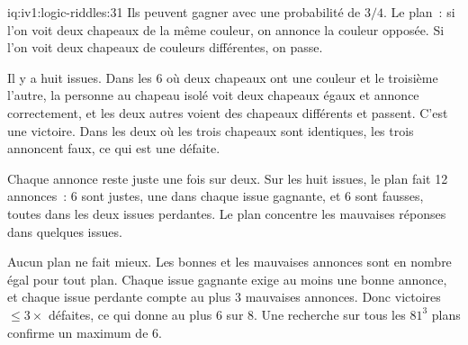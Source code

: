 \begin{solution}{iq:iv1:logic-riddles:31}
Ils peuvent gagner avec une probabilité de $3/4$. Le plan~: si l'on voit deux chapeaux de la même couleur, on annonce la couleur opposée. Si l'on voit deux chapeaux de couleurs différentes, on passe.

Il y a huit issues. Dans les 6 où deux chapeaux ont une couleur et le troisième l'autre, la personne au chapeau isolé voit deux chapeaux égaux et annonce correctement, et les deux autres voient des chapeaux différents et passent. C'est une victoire. Dans les deux où les trois chapeaux sont identiques, les trois annoncent faux, ce qui est une défaite.

Chaque annonce reste juste une fois sur deux. Sur les huit issues, le plan fait 12 annonces~: 6 sont justes, une dans chaque issue gagnante, et 6 sont fausses, toutes dans les deux issues perdantes. Le plan concentre les mauvaises réponses dans quelques issues.

Aucun plan ne fait mieux. Les bonnes et les mauvaises annonces sont en nombre égal pour tout plan. Chaque issue gagnante exige au moins une bonne annonce, et chaque issue perdante compte au plus 3 mauvaises annonces. Donc victoires $\le 3 \times$ défaites, ce qui donne au plus $6$ sur 8. Une recherche sur tous les $81^3$ plans confirme un maximum de 6.

\end{solution}

